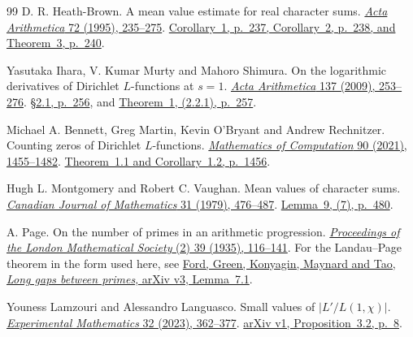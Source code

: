 \begin{thebibliography}{99}
D. R. Heath-Brown.
A mean value estimate for real character sums.
\href{https://doi.org/10.4064/aa-72-3-235-275}
{\emph{Acta Arithmetica} 72 (1995), 235--275}.
\href{https://www.impan.pl/en/publishing-house/journals-and-series/acta-arithmetica/all/72/3/108575/a-mean-value-estimate-for-real-character-sums}
{Corollary~1, p.~237, Corollary~2, p.~238, and Theorem~3, p.~240}.

Yasutaka Ihara, V. Kumar Murty and Mahoro Shimura.
On the logarithmic derivatives of Dirichlet \(L\)-functions at \(s=1\).
\href{https://doi.org/10.4064/aa137-3-6}
{\emph{Acta Arithmetica} 137 (2009), 253--276}.
\href{https://www.impan.pl/shop/en/publication/transaction/download/product/82940\#page=4}
{\S2.1, p.~256}, and
\href{https://www.impan.pl/shop/en/publication/transaction/download/product/82940\#page=5}
{Theorem~1, (2.2.1), p.~257}.

Michael A. Bennett, Greg Martin, Kevin O'Bryant and Andrew Rechnitzer.
Counting zeros of Dirichlet \(L\)-functions.
\href{https://doi.org/10.1090/mcom/3599}
{\emph{Mathematics of Computation} 90 (2021), 1455--1482}.
\href{https://personal.math.ubc.ca/~bennett/BeMaObRe-MathComp-2021.pdf\#page=2}
{Theorem~1.1 and Corollary~1.2, p.~1456}.

Hugh L. Montgomery and Robert C. Vaughan.
Mean values of character sums.
\href{https://doi.org/10.4153/CJM-1979-053-2}
{\emph{Canadian Journal of Mathematics} 31 (1979), 476--487}.
\href{https://www.cambridge.org/core/services/aop-cambridge-core/content/view/9372DCDEE648FF605F66A10314977F5F/S0008414X00012116a.pdf/div-class-title-mean-values-of-character-sums-div.pdf\#page=5}
{Lemma~9, (7), p.~480}.

A. Page.
On the number of primes in an arithmetic progression.
\href{https://londmathsoc.onlinelibrary.wiley.com/doi/10.1112/plms/s2-39.1.116}
{\emph{Proceedings of the London Mathematical Society} (2) 39 (1935),
116--141}.
For the Landau--Page theorem in the form used here, see
\href{https://arxiv.org/pdf/1412.5029v3\#page=32}
{Ford, Green, Konyagin, Maynard and Tao, \emph{Long gaps between
primes}, arXiv v3, Lemma~7.1}.

Youness Lamzouri and Alessandro Languasco.
Small values of \(\lvert L'/L(1,\chi)\rvert\).
\href{https://doi.org/10.1080/10586458.2021.1927255}
{\emph{Experimental Mathematics} 32 (2023), 362--377}.
\href{https://arxiv.org/pdf/2005.10714v1\#page=8}
{arXiv v1, Proposition~3.2, p.~8}.


\end{thebibliography}
